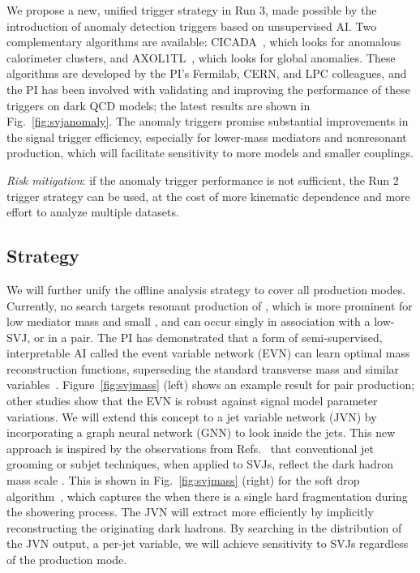 We propose a new, unified trigger strategy in Run 3, made possible by the introduction of anomaly detection triggers based on unsupervised AI.
Two complementary algorithms are available: CICADA~\cite{CMS-DP-2023-086}, which looks for anomalous calorimeter clusters, and AXOL1TL~\cite{CMS-DP-2023-079}, which looks for global anomalies.
These algorithms are developed by the PI's Fermilab, CERN, and LPC colleagues, and the PI has been involved with validating and improving the performance of these triggers on dark QCD models;
the latest results are shown in Fig.~\ref{fig:svjanomaly}.
The anomaly triggers promise substantial improvements in the signal trigger efficiency, especially for lower-mass \PZprime mediators and nonresonant production,
which will facilitate sensitivity to more models and smaller couplings.

\textit{Risk mitigation}: if the anomaly trigger performance is not sufficient, the Run 2 trigger strategy can be used, at the cost of more kinematic dependence and more effort to analyze multiple datasets.

\subsection{Strategy}\label{subsec:strategy}

We will further unify the offline analysis strategy to cover all production modes.
Currently, no search targets resonant production of \Pbifun, which is more prominent for low mediator mass and small \sbifun, and can occur singly in association with a low-\pt SVJ, or in a pair.
The PI has demonstrated that a form of semi-supervised, interpretable AI called the event variable network (EVN)
can learn optimal mass reconstruction functions, superseding the standard transverse mass and similar variables~\cite{Pedro:2023sdp}.
Figure~\ref{fig:svjmass} (left) shows an example result for \Pbifun pair production; other studies show that the EVN is robust against signal model parameter variations.
We will extend this concept to a jet variable network (JVN) by incorporating a graph neural network (GNN) to look inside the jets.
This new approach is inspired by the observations from Refs.~\cite{Strassler:2008fv,CMS:2021dzg} that conventional jet grooming or subjet techniques, when applied to SVJs, reflect the dark hadron mass scale \mdark.
This is shown in Fig.~\ref{fig:svjmass} (right) for the soft drop algorithm~\cite{Larkoski:2014wba}, which captures the \mdark when there is a single hard fragmentation during the showering process.
The JVN will extract \mdark more efficiently by implicitly reconstructing the originating dark hadrons.
By searching in the distribution of the JVN output, a per-jet variable, we will achieve sensitivity to SVJs regardless of the production mode.

